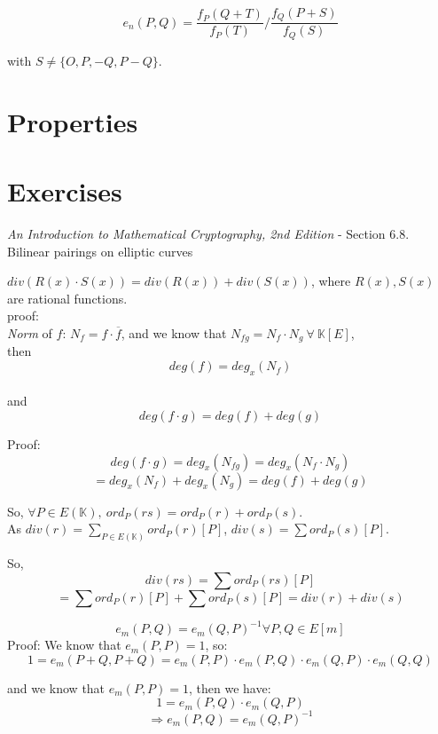 \documentclass{article}
\theoremstyle{definition}
\newenvironment{solution}[1]
{\renewcommand\theinnersolution{#1}\innersolution}
{\endinnersolution}
\begin{document}
$$
e_n(P, Q) = \frac{f_P(Q+T)}{f_P(T)} / \frac{f_Q(P+S)}{f_Q(S)}
$$

with $S \neq \{O, P, -Q, P-Q \}$.


\section{Properties}


\section{Exercises}
\emph{An Introduction to Mathematical Cryptography, 2nd Edition} - Section 6.8. Bilinear pairings on elliptic curves

\begin{solution}{6.29}
  $div(R(x) \cdot S(x)) = div( R(x)) + div( S(x))$, where $R(x), S(x)$ are rational functions.
  \\proof:\\
  \emph{Norm} of $f$: $N_f = f \cdot \overline{f}$, and we know that $N_{fg} = N_f \cdot N_g~\forall~\mathbb{K}[E]$,\\
  then $$deg(f) = deg_x(N_f)$$\\
  and $$deg(f \cdot g) = deg(f) + deg(g)$$

  Proof:
  $$deg(f \cdot g) = deg_x(N_{fg}) = deg_x(N_f \cdot N_g)$$
  $$= deg_x(N_f) + deg_x(N_g) = deg(f) + deg(g)$$

  So, $\forall P \in E(\mathbb{K}),~ ord_P(rs) = ord_P(r) + ord_P(s)$.\\
  As $div(r) = \sum_{P\in E(\mathbb{K})} ord_P(r)[P]$, $div(s) = \sum ord_P(s)[P]$.

  So,
  $$div(rs) = \sum ord_P(rs)[P]$$
  $$= \sum ord_P(r)[P] + \sum ord_P(s)[P] = div(r) + div(s)$$
\end{solution}

\vspace{0.5cm}

\begin{solution}{6.31}
  $$e_m(P, Q) = e_m(Q, P)^{-1} \forall P, Q \in E[m]$$
  Proof:
  We know that $e_m(P, P) = 1$, so:
  $$1 = e_m(P+Q, P+Q) = e_m(P, P) \cdot e_m(P, Q) \cdot e_m(Q, P) \cdot e_m(Q, Q)$$

  and we know that $e_m(P, P) = 1$, then we have:
  $$1 = e_m(P, Q) \cdot e_m(Q, P)$$
  $$\Longrightarrow e_m(P, Q) = e_m(Q, P)^{-1}$$
\end{solution}
\end{document}
